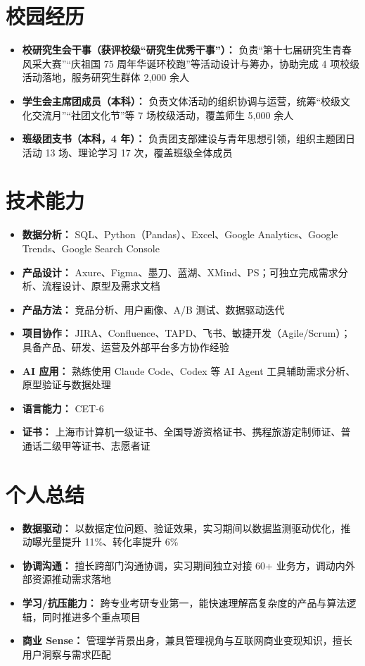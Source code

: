 \documentclass{resume}
\begin{document}
\section[校园经历]{校园经历}

\begin{itemize}
  \item \textbf{校研究生会干事（获评校级“研究生优秀干事”）：} 负责“第十七届研究生青春风采大赛”“庆祖国 75 周年华诞环校跑”等活动设计与筹办，协助完成 4 项校级活动落地，服务研究生群体 2,000 余人
  \item \textbf{学生会主席团成员（本科）：} 负责文体活动的组织协调与运营，统筹“校级文化交流月”“社团文化节”等 7 场校级活动，覆盖师生 5,000 余人
  \item \textbf{班级团支书（本科，4 年）：} 负责团支部建设与青年思想引领，组织主题团日活动 13 场、理论学习 17 次，覆盖班级全体成员
\end{itemize}

\section[技术能力]{技术能力}

\begin{itemize}
  \item \textbf{数据分析：} SQL、Python（Pandas）、Excel、Google Analytics、Google Trends、Google Search Console
  \item \textbf{产品设计：} Axure、Figma、墨刀、蓝湖、XMind、PS；可独立完成需求分析、流程设计、原型及需求文档
  \item \textbf{产品方法：} 竞品分析、用户画像、A/B 测试、数据驱动迭代
  \item \textbf{项目协作：} JIRA、Confluence、TAPD、飞书、敏捷开发（Agile/Scrum）；具备产品、研发、运营及外部平台多方协作经验
  \item \textbf{AI 应用：} 熟练使用 Claude Code、Codex 等 AI Agent 工具辅助需求分析、原型验证与数据处理
  \item \textbf{语言能力：} CET-6
  \item \textbf{证书：} 上海市计算机一级证书、全国导游资格证书、携程旅游定制师证、普通话二级甲等证书、志愿者证
\end{itemize}

\section[个人总结]{个人总结}

\begin{itemize}
  \item \textbf{数据驱动：} 以数据定位问题、验证效果，实习期间以数据监测驱动优化，推动曝光量提升 11\%、转化率提升 6\%
  \item \textbf{协调沟通：} 擅长跨部门沟通协调，实习期间独立对接 60+ 业务方，调动内外部资源推动需求落地
  \item \textbf{学习/抗压能力：} 跨专业考研专业第一，能快速理解高复杂度的产品与算法逻辑，同时推进多个重点项目
  \item \textbf{商业 Sense：} 管理学背景出身，兼具管理视角与互联网商业变现知识，擅长用户洞察与需求匹配
\end{itemize}
\end{document}
